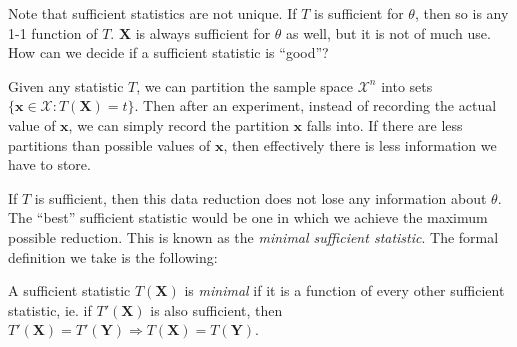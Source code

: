 \documentclass[a4paper]{article}
\begin{document}
Note that sufficient statistics are not unique. If $T$ is sufficient for $\theta$, then so is any 1-1 function of $T$. $\mathbf{X}$ is always sufficient for $\theta$ as well, but it is not of much use. How can we decide if a sufficient statistic is ``good''?

Given any statistic $T$, we can partition the sample space $\mathcal{X}^n$ into sets $\{\mathbf{x}\in \mathcal{X}: T(\mathbf{X}) = t\}$. Then after an experiment, instead of recording the actual value of $\mathbf{x}$, we can simply record the partition $\mathbf{x}$ falls into. If there are less partitions than possible values of $\mathbf{x}$, then effectively there is less information we have to store.

If $T$ is sufficient, then this data reduction does not lose any information about $\theta$. The ``best'' sufficient statistic would be one in which we achieve the maximum possible reduction. This is known as the \emph{minimal sufficient statistic}. The formal definition we take is the following:

\begin{defi}
  A sufficient statistic $T(\mathbf{X})$ is \emph{minimal} if it is a function of every other sufficient statistic, ie. if $T'(\mathbf{X})$ is also sufficient, then $T'(\mathbf{X}) = T'(\mathbf{Y}) \Rightarrow  T(\mathbf{X}) = T(\mathbf{Y})$.
\end{defi}
\end{document}
